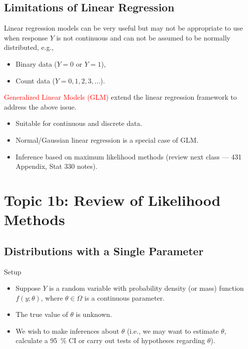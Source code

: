 \documentclass[oneside]{book}\usepackage[]{graphicx}\usepackage[svgnames]{xcolor}
\newcommand{\makeheading}[2]%
{%
\begin{center}%
    \makebox[\linewidth]{\raisebox{-.5ex}[0cm][0cm]{\stackanchor{\textcolor{Gray}{\textsc{#1}}}{\scriptsize\itshape\printyearoff#2}\;}\color{Crimson!50}\hrulefill}%
\end{center}%
}%
\begin{document}
\subsection*{Limitations of Linear Regression}
Linear regression models can be very useful but may not be appropriate to use
when response $ Y $ is not continuous and can not be assumed to be normally
distributed, e.g.,
\begin{itemize}
      \item Binary data ($ Y=0 $ or $ Y=1 $),
      \item Count data ($ Y=0,1,2,3,\ldots $).
\end{itemize}
\textcolor{Red}{Generalized Linear Models (GLM)} extend the linear regression framework to
address the above issue.
\begin{itemize}
      \item Suitable for continuous and discrete data.
      \item Normal/Gaussian linear regression is a special case of GLM.
      \item Inference based on maximum likelihood methods (review next class --- 431
            Appendix, Stat 330 notes).
\end{itemize}

\makeheading{Week 2}{\daterange{2021-09-13}{2021-09-17}}
\section*{Topic 1b: Review of Likelihood Methods}
\subsection*{Distributions with a Single Parameter}
\begin{Regular}{Setup}
      \begin{itemize}
            \item Suppose $ Y $ is a random variable with probability density (or mass) function
                  $ f(y;\theta) $, where $ \theta\in\Omega $ is a continuous parameter.
            \item The true value of $ \theta $ is unknown.
            \item We wish to make inferences about $ \theta $ (i.e., we may want to estimate $ \theta $, calculate
                  a \qty{95}{\percent} CI or carry out tests of hypotheses regarding $ \theta $).
      \end{itemize}
\end{Regular}
\end{document}
